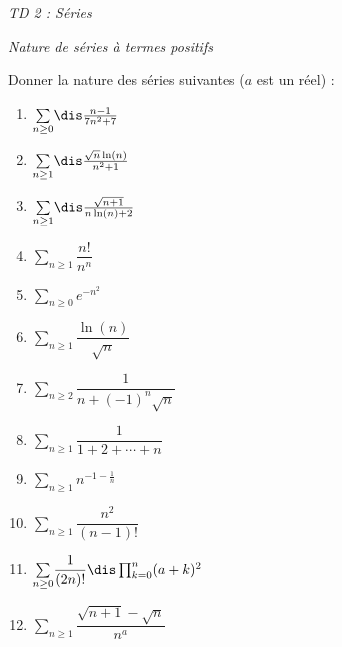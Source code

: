 \documentclass[a4paper,10pt]{report}
\newcommand{\Sum}[2]{\ensuremath{\textstyle{\sum\limits_{#1}^{#2}}}}
\begin{document}
\everymath{\displaystyle}
\begin{center}
\textit{{ {\huge TD 2 : Séries}}}
\end{center}
\bigskip


\begin{center}
\textit{{ {\large Nature de séries à termes positifs}}}
\end{center}


\begin{Exercice}{} Donner la nature des séries suivantes ($a$ est un réel) :
\begin{multicols}{3}
\begin{enumerate}
\item $\Sum{n \geq 0}{} \dis\frac{n-1}{7n^2+7}$
\item $\Sum{n \geq 1}{}\dis\frac{\sqrt{n}\ln(n)}{n^2+1}$
\item $\Sum{n \geq 1}{}\dis\frac{\sqrt{n+1}}{n\ln(n)+2}$ 
\item $\Sum{n \geq 1}{} \dfrac{n!}{n^n} $
\columnbreak
\item $\Sum{n \geq 0}{} e^{-n^2} $
\item $\Sum{n \geq 1}{} \dfrac{\ln(n)}{\sqrt{n}} $
\item $\Sum{n \geq 2}{} \dfrac{1}{n+(-1)^n \sqrt{n}} $
\item $\Sum{n \geq 1}{} \dfrac{1}{1+2+ \cdots + n} $
\columnbreak
\item $\Sum{n \geq 1}{} n^{-1- \frac{1}{n}} $
\item $\Sum{n \geq 1}{}  \dfrac{n^2}{(n-1)!} $
\item $\Sum{n \geq 0}{} \dfrac{1}{(2n)!} \dis \prod_{k=0}^n (a+k)^2$ 
\item $\Sum{n \geq 1}{} \dfrac{\sqrt{n+1}-\sqrt{n}}{n^a}$ 
\end{enumerate}
\end{multicols}

\vspace{0.05cm}

\end{Exercice}

\corr 
\end{document}

